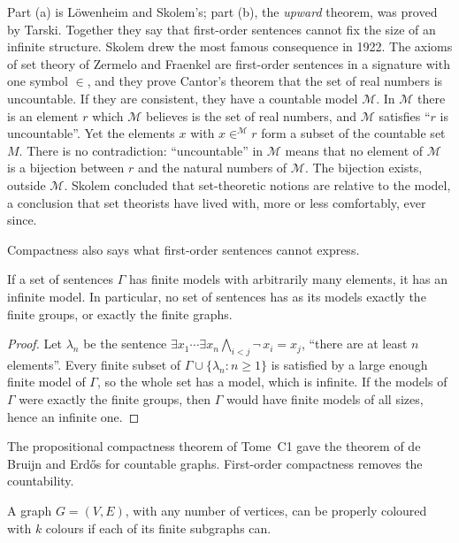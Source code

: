 Part (a) is Löwenheim and Skolem's; part (b), the \emph{upward} theorem, was proved by Tarski. Together they say that first-order sentences cannot fix the size of an infinite structure. Skolem drew the most famous consequence in 1922. The axioms of set theory of Zermelo and Fraenkel are first-order sentences in a signature with one symbol $\in$, and they prove Cantor's theorem that the set of real numbers is uncountable. If they are consistent, they have a countable model $\mathcal M$. In $\mathcal M$ there is an element $r$ which $\mathcal M$ believes is the set of real numbers, and $\mathcal M$ satisfies ``$r$ is uncountable''. Yet the elements $x$ with $x\in^{\mathcal M}r$ form a subset of the countable set $M$. There is no contradiction: ``uncountable'' in $\mathcal M$ means that no element of $\mathcal M$ is a bijection between $r$ and the natural numbers of $\mathcal M$. The bijection exists, outside $\mathcal M$. Skolem concluded that set-theoretic notions are relative to the model, a conclusion that set theorists have lived with, more or less comfortably, ever since.

Compactness also says what first-order sentences cannot express.

\begin{proposition}\label{prop:finiteness}
If a set of sentences $\Gamma$ has finite models with arbitrarily many elements, it has an infinite model. In particular, no set of sentences has as its models exactly the finite groups, or exactly the finite graphs.
\end{proposition}

\begin{proof}
Let $\lambda_n$ be the sentence $\exists x_1\cdots\exists x_n\bigwedge_{i<j}\neg\,x_i=x_j$, ``there are at least $n$ elements''. Every finite subset of $\Gamma\cup\{\lambda_n:n\ge1\}$ is satisfied by a large enough finite model of $\Gamma$, so the whole set has a model, which is infinite. If the models of $\Gamma$ were exactly the finite groups, then $\Gamma$ would have finite models of all sizes, hence an infinite one.
\end{proof}

The propositional compactness theorem of Tome~C1 gave the theorem of de Bruijn and Erdős for countable graphs. First-order compactness removes the countability.

\begin{corollary}\label{cor:dbegeneral}
A graph $G=(V,E)$, with any number of vertices, can be properly coloured with $k$ colours if each of its finite subgraphs can.
\end{corollary}

